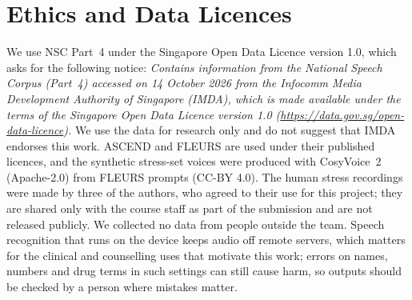 \section*{Ethics and Data Licences}

We use NSC Part~4 under the Singapore Open Data Licence version 1.0, which asks for the following notice: \emph{Contains information from the National Speech Corpus (Part~4) accessed on 14 October 2026 from the Infocomm Media Development Authority of Singapore (IMDA), which is made available under the terms of the Singapore Open Data Licence version 1.0 (\url{https://data.gov.sg/open-data-licence}).} We use the data for research only and do not suggest that IMDA endorses this work. ASCEND and FLEURS are used under their published licences, and the synthetic stress-set voices were produced with CosyVoice~2 (Apache-2.0) from FLEURS prompts (CC-BY 4.0). The human stress recordings were made by three of the authors, who agreed to their use for this project; they are shared only with the course staff as part of the submission and are not released publicly. We collected no data from people outside the team. Speech recognition that runs on the device keeps audio off remote servers, which matters for the clinical and counselling uses that motivate this work; errors on names, numbers and drug terms in such settings can still cause harm, so outputs should be checked by a person where mistakes matter.
